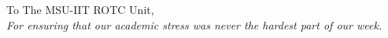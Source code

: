 \begin{dedication}
\large{To The MSU-IIT ROTC Unit,}\\[5mm]
\textit{For ensuring that our academic stress was never the hardest part of our week.}
\end{dedication}